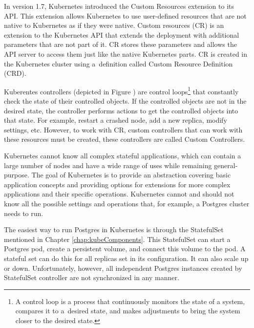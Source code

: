 In version 1.7, Kubernetes introduced the Custom Resources extension to its API. \cite{githubIBMCr} This extension allows Kubernetes to use user-defined resources that are not native to Kubernetes as if they were native. \cite{NewStackCRDs} Custom resources (CR) is an extension to the Kubernetes API that extends the deployment with additional parameters that are not part of it. CR stores these parameters and allows the API server to access them just like the native Kubernetes parts. CR is created in the Kubernetes cluster using a definition called Custom Resource Definition (CRD). \cite{operatorsAtK8sIface}

Kuberentes controllers (depicted in Figure ) are control loops\footnote[1]{A control loop is a process that continuously monitors the state of a system, compares it to a desired state, and makes adjustments to bring the system closer to the desired state.} that constantly check the state of their controlled objects. If the controlled objects are not in the desired state, the controller performs actions to get the controlled objects into that state. For example, restart a crashed node, add a new replica, modify settings, etc. \cite{docuKubeControllers}
However, to work with CR, custom controllers that can work with these resources must be created, these controllers are called Custom Controllers. \cite{docuKubeCR}



\label{chap:postgresInKube}
Kubernetes cannot know all complex stateful applications, which can contain a large number of nodes and have a wide range of uses while remaining general-purpose.
The goal of Kubernetes is to provide an abstraction covering basic application concepts and providing options for extensions for more complex applications and their specific operations.
Kubernetes cannot and should not know all the possible settings and operations that, for example, a Postgres cluster needs to run. \cite{operatorsTeaches}

The easiest way to run Postgres in Kubernetes is through the StatefulSet mentioned in Chapter \ref{chap:kubeComponents}. This StatefulSet can start a Postgres pod, create a persistent volume, and connect this volume to the pod. A stateful set can do this for all replicas set in its configuration. It can also scale up or down. Unfortunately, however, all independent Postgres instances created by StatefulSet controller are not synchronized in any manner.


